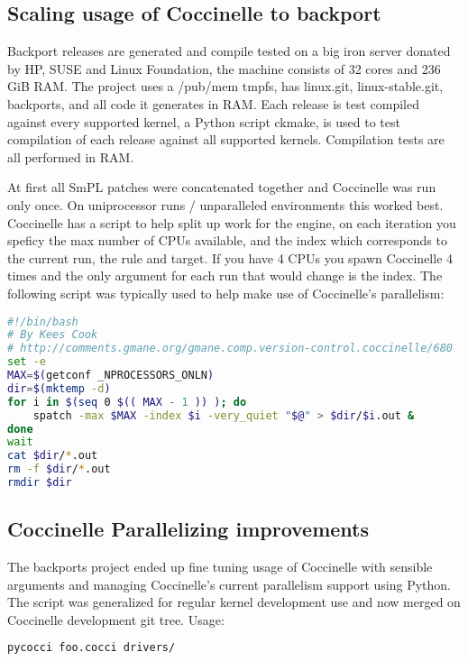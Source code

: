 \documentclass[a4paper,10pt]{article}
\begin{document}
\subsection{Scaling usage of Coccinelle to backport}

Backport releases are generated and compile tested on a big iron server donated
by HP, SUSE and Linux Foundation, the machine consists of 32 cores and 236 GiB
RAM.  The project uses a /pub/mem tmpfs, has linux.git, linux-stable.git,
backports, and all code it generates in RAM. Each release is test compiled
against every supported kernel, a Python script ckmake, is used to test
compilation of each release against all supported kernels.  Compilation tests
are all performed in RAM.

At first all SmPL patches were concatenated together and Coccinelle was run
only once. On uniprocessor runs / unparalleled environments this worked best.
Coccinelle has a script to help split up work for the engine, on each iteration
you speficy the max number of CPUs available, and the index which corresponds
to the current run, the rule and target. If you have 4 CPUs you spawn
Coccinelle 4 times and the only argument for each run that would change is the
index. The following script was typically used to help make use of Coccinelle's
parallelism:

\begin{lstlisting}[language=bash]
#!/bin/bash
# By Kees Cook
# http://comments.gmane.org/gmane.comp.version-control.coccinelle/680
set -e
MAX=$(getconf _NPROCESSORS_ONLN)
dir=$(mktemp -d)
for i in $(seq 0 $(( MAX - 1 )) ); do
    spatch -max $MAX -index $i -very_quiet "$@" > $dir/$i.out &
done
wait
cat $dir/*.out
rm -f $dir/*.out
rmdir $dir
\end{lstlisting}

\subsection{Coccinelle Parallelizing improvements}

The backports project ended up fine tuning usage of Coccinelle
with sensible arguments and managing Coccinelle's current parallelism
support using Python. The script was generalized for regular
kernel development use and now merged on Coccinelle development
git tree. Usage:

\begin{lstlisting}[language=bash]
pycocci foo.cocci drivers/
\end{lstlisting}
\end{document}
